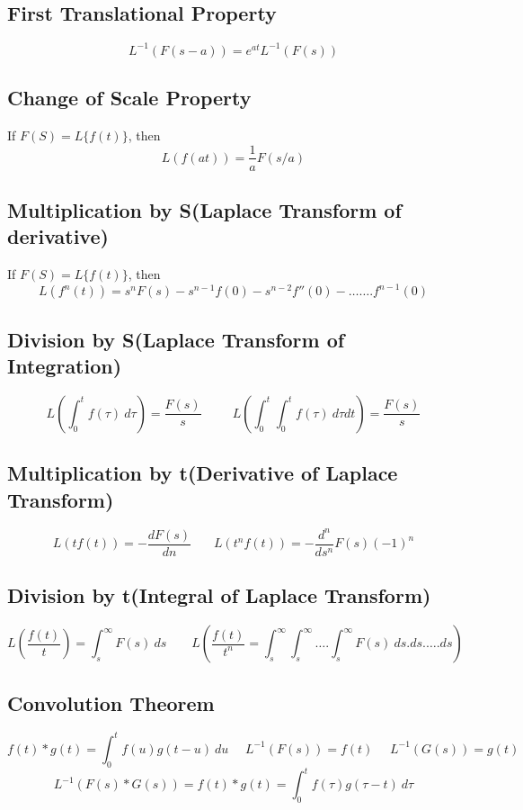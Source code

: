 \subsection*{First Translational Property}
\[L^{-1}\left(F(s-a)\right)=e^{at}L^{-1}\left(F(s)\right)\]

\subsection*{Change of Scale Property}
If \(F(S)=L\{f(t)\}\), then
\[L\left(f(at)\right)=\frac{1}{a}F(s/a)\]

\subsection*{Multiplication by S(Laplace Transform of derivative)}
If \(F(S)=L\{f(t)\}\), then
\[L\left(f^n(t)\right)=s^nF(s)-s^{n-1}f(0)-s^{n-2}f''(0)-\ldots\ldots.f^{n-1}(0)\]

\subsection*{Division by S(Laplace Transform of Integration)}
\[L\left(\int_0^tf(\tau)\ d\tau\right)=\frac{F(s)}{s}\ \ \ \ \ \ \ \ \ \ \ L\left(\int_0^t \int_0^tf(\tau)\ d\tau dt\right)=\frac{F(s)}{s}\]

\subsection*{Multiplication by t(Derivative of Laplace Transform)}
\[L\left(tf(t)\right)=-\frac{dF(s)}{dn}\ \ \ \ \ \ \ \ L\left(t^nf(t) \right)=-\frac{d^n}{ds^n}F(s)(-1)^n \]

\subsection*{Division by t(Integral of Laplace Transform)}
\[L\left(\frac{f(t)}{t} \right)=\int_s^{\infty}F(s)\ ds\ \ \ \ \ \ \ \ \ L\left(\frac{f(t)}{t^n}=\int_s^{\infty}\int_s^{\infty}\ldots.\int_s^{\infty}F(s)\ ds.ds.\ldots. ds \right)\]

\subsection*{Convolution Theorem}
\[f(t)*g(t)=\int_0^tf(u)g(t-u)\ du\ \ \ \ \ \ L^{-1}\left(F(s)\right)=f(t)\ \ \ \ \ \ L^{-1}\left(G(s)\right)=g(t)\]
\[L^{-1}\left( F(s)*G(s)\right)=f(t)*g(t)=\int_0^tf(\tau)g(\tau-t)\ d\tau\]

